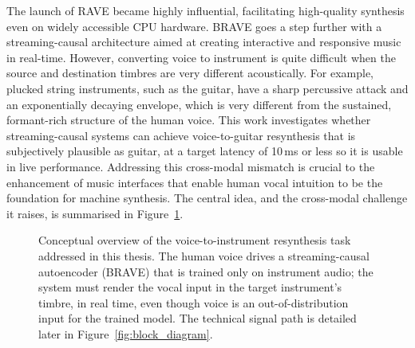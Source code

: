 \documentclass[a4paper,11pt,oneside,openany]{book}
\begin{document}
The launch of RAVE \parencite{caillon2021rave} became highly influential, facilitating high-quality synthesis even on widely accessible CPU hardware. BRAVE \parencite{caspe2025brave} goes a step further with a streaming-causal architecture aimed at creating interactive and responsive music in real-time. However, converting voice to instrument is quite difficult when the source and destination timbres are very different acoustically. For example, plucked string instruments, such as the guitar, have a sharp percussive attack and an exponentially decaying envelope, which is very different from the sustained, formant-rich structure of the human voice. This work investigates whether streaming-causal systems can achieve voice-to-guitar resynthesis that is subjectively plausible as guitar, at a target latency of 10\,ms or less so it is usable in live performance. Addressing this cross-modal mismatch is crucial to the enhancement of music interfaces that enable human vocal intuition to be the foundation for machine synthesis. The central idea, and the cross-modal challenge it raises, is summarised in Figure~\ref{fig:concept}.

\begin{figure}[H]
\centering
{}
\caption{Conceptual overview of the voice-to-instrument resynthesis task addressed in this thesis. The human voice drives a streaming-causal autoencoder (BRAVE) that is trained only on instrument audio; the system must render the vocal input in the target instrument's timbre, in real time, even though voice is an out-of-distribution input for the trained model. The technical signal path is detailed later in Figure~\ref{fig:block_diagram}.}
\label{fig:concept}
\end{figure}
\end{document}
